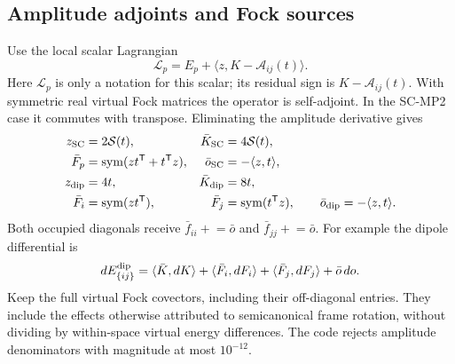 \documentclass[11pt]{article}
\newcommand{\T}{^{\mathsf T}}
\newcommand{\sym}{\operatorname{sym}}
\newcommand{\ip}[2]{\langle #1,#2\rangle}
\begin{document}
\subsection{Amplitude adjoints and Fock sources}
Use the local scalar Lagrangian
\begin{equation}
 \mathcal L_p=E_p+\ip z{K-\mathcal A_{ij}(t)}.
 \label{eq:gradient-screened-lagrangian}
\end{equation}
Here $\mathcal L_p$ is only a notation for this scalar; its residual sign
is $K-\mathcal A_{ij}(t)$. With symmetric real virtual Fock matrices the
operator is self-adjoint. In the SC-MP2 case it commutes with transpose.
Eliminating the amplitude derivative gives
\begin{align}
 z_{\rm SC}&=2\mathcal S(t),& \bar K_{\rm SC}&=4\mathcal S(t),\\
 \bar F_p&=\sym(zt\T+t\T z),& \bar o_{\rm SC}&=-\ip zt,\\
 z_{\rm dip}&=4t,& \bar K_{\rm dip}&=8t,\\
 \bar F_i&=\sym(zt\T),& \bar F_j&=\sym(t\T z),\qquad
 \bar o_{\rm dip}=-\ip zt.
 \label{eq:gradient-screened-bars}
\end{align}
Both occupied diagonals receive $\bar f_{ii}\mathrel{+}=\bar o$ and
$\bar f_{jj}\mathrel{+}=\bar o$. For example the dipole differential is
\begin{equation}
 dE_{\{ij\}}^{\rm dip}=\ip{\bar K}{dK}+\ip{\bar F_i}{dF_i}
                  +\ip{\bar F_j}{dF_j}+\bar o\,do.
\end{equation}
Keep the full virtual Fock covectors, including their off-diagonal entries.
They include the effects otherwise attributed to semicanonical frame
rotation, without dividing by within-space virtual energy differences.
The code rejects amplitude denominators with magnitude at most $10^{-12}$.
\end{document}

